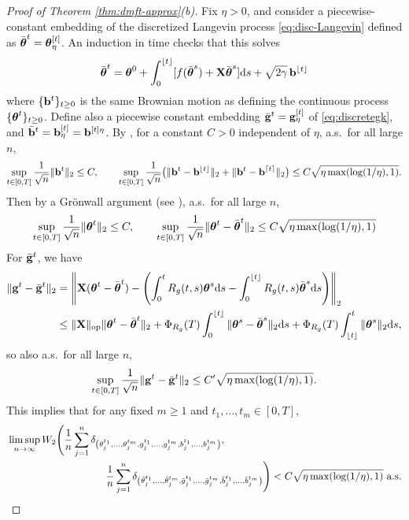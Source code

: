 \begin{proof}[Proof of Theorem \ref{thm:dmft-approx}(b)]
Fix $\eta>0$, and consider a piecewise-constant embedding 
of the discretized Langevin process
\eqref{eq:disc-Langevin} defined as $\bar{\boldsymbol{\theta}}^t = \boldsymbol{\theta}_\eta^{[t]}$.
An induction in time checks that this solves
\begin{equation}\label{eq:langevin_discret}
\bar{\boldsymbol{\theta}}^t=\boldsymbol{\theta}^0+\int_0^{\lfloor{t}\rfloor} [f(\bar{\boldsymbol{\theta}}^s)
+\mathbf{X}\bar{\boldsymbol{\theta}}^s]\mathrm{d} s +\sqrt{2\gamma}\,\mathbf{b}^{\lfloor{t}\rfloor}
\end{equation}
where $\{\mathbf{b}^t\}_{t \geq 0}$ is the same Brownian motion as defining the
continuous process $\{\boldsymbol{\theta}^t\}_{t \geq 0}$.
Define also a piecewise constant embedding $\bar {\mathbf{g}}^t=\mathbf{g}_\eta^{[t]}$ of
\eqref{eq:discretegk}, and $\bar {\mathbf{b}}^t=\mathbf{b}_\eta^{[t]}=\mathbf{b}^{[t]\eta}$.
By \cite[Lemma 4.7]{fan2025dynamicalI}, for a constant $C>0$ independent of
$\eta$, a.s.\ for all large $n$,
\begin{align*}
\sup_{t\in[0,T]} \frac{1}{\sqrt{n}}\|\mathbf{b}^t\|_2\leq C,
\qquad \sup_{t\in[0,T]}
\frac{1}{\sqrt{n}}\big(\|{\mathbf{b}^t - \mathbf{b}^{\lfloor{t}\rfloor}}\|_2 + \|{\mathbf{b}^t -
\mathbf{b}^{\lceil{t}\rceil}}\|_2\big) \leq C\sqrt{\eta\max(\log(1/\eta),1)}.
\end{align*}
Then by a Gr\"onwall argument (see \cite[Lemma 4.8]{fan2025dynamicalI}), a.s.\ for
all large $n$,
\begin{align}
\sup_{t\in[0,T]}
\frac{1}{\sqrt{n}}\|{\boldsymbol{\theta}^t}\|_2 \leq C,\qquad \sup_{t\in[0,T]}
\frac{1}{\sqrt{n}}\|{\boldsymbol{\theta}^t - \bar{\boldsymbol{\theta}}^{t}}\|_2 \leq
C\sqrt{\eta\max(\log(1/\eta),1)}\label{eq:theta-discret-norm}
\end{align}
For $\bar {\mathbf{g}}^t$, we have
\begin{align*}
    \|\mathbf{g}^t - \bar {\mathbf{g}}^t\|_2 &= \left\|\mathbf{X}(\boldsymbol{\theta}^t-\bar{\boldsymbol{\theta}}^t)-\left(\int_0^t
R_g(t,s)\boldsymbol{\theta}^s\mathrm{d} s - \int_0^{\lfloor t\rfloor} R_g(t,s)\bar{\boldsymbol{\theta}}^s \mathrm{d}
s\right)\right\|_2\\
    & \le \|\mathbf{X}\|_{\mathrm{op}}\|\boldsymbol{\theta}^t-\bar{\boldsymbol{\theta}}^t\|_2 + \Phi_{R_g}(T)\int_0^{\lfloor
t\rfloor} \|\boldsymbol{\theta}^s-\bar{\boldsymbol{\theta}}^s\|_2 \mathrm{d} s +  \Phi_{R_g}(T)\int_{\lfloor
t\rfloor}^t \|\boldsymbol{\theta}^s\|_2\mathrm{d} s,
\end{align*}
so also a.s.\ for all large $n$,
\begin{align*}
\sup_{t\in[0,T]}
\frac{1}{\sqrt{n}}\|{\mathbf{g}^t - \bar{\mathbf{g}}^{t}}\|_2 \leq C'\sqrt{\eta\max(\log(1/\eta),1)}.
\end{align*}
This implies that for any fixed $m \geq 1$ and $t_1,\ldots, t_m \in [0,T]$,
\begin{align}
&\limsup_{n\rightarrow\infty} W_2\Bigg( \frac{1}{n}\sum_{j=1}^n
\delta_{\left(\theta^{t_1}_j, \ldots, \theta^{t_m}_j,g^{t_1}_j, \ldots,
g^{t_m}_j,b^{t_1}_j, \ldots, b^{t_m}_j\right)},\notag\\
&\hspace{3.4cm} \frac{1}{n}\sum_{j=1}^n
\delta_{\left(\bar\theta^{t_1}_j, \ldots,
\bar\theta_j^{t_m},\bar g^{t_1}_j, \ldots,
\bar g_j^{t_m},\bar b^{t_1}_{j}, \ldots,
\bar b_{j}^{t_m}\right)}\Bigg)<C\sqrt{\eta\max(\log(1/\eta),1)}\text{ a.s.}\label{eq:discretelangevinW2}
\end{align}


\end{proof}

